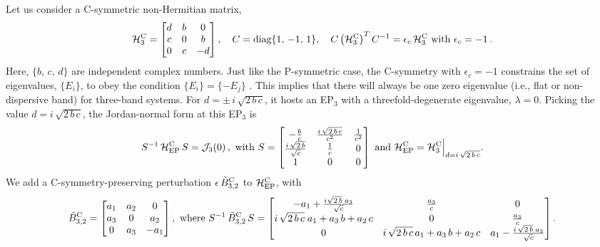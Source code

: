 \documentclass[aps, prb, onecolumn, nofootinbib, citeautoscript, 10pt]{revtex4-2}
\begin{document}
Let us consider a C-symmetric non-Hermitian matrix,
\begin{align}
\label{eqcsym}
\mathcal H^{\rm C}_3 = \begin{bmatrix}
 d & b & 0 \\
 c & 0 & b \\
 0 & c & -d \\
\end{bmatrix}, \quad
C =\text{diag}\lbrace 1,\,-1,\,1 \rbrace,\quad
C \left ( \mathcal H^{\rm C}_3\right )^T C^{-1} = \epsilon_c \, \mathcal H^{\rm C}_3  \text{ with } \epsilon_c=-1 \,.
\end{align}
Here, $\lbrace b, \, c,\, d \rbrace $ are independent complex numbers. Just like the P-symmetric case, the C-symmetry with $\epsilon_c = -1 $ constrains the set of eigenvalues, $ \lbrace E_i \rbrace$, to obey the condition $\lbrace E_i \rbrace = \lbrace - E_j \rbrace $ \cite{emil_nh_nodal}. This implies that there will always be one zero eigenvalue (i.e., flat or non-dispersive band) for three-band systems.
For $ d = \pm\,i\,\sqrt{2\, b\, c} $, it hosts an EP$_3$ with a threefold-degenerate eigenvalue, $\lambda = 0$. Picking the value $ d = i\,\sqrt{2\, b\, c} $, the Jordan-normal form at this EP$_3$ is
\begin{align}
S^{-1} \, {\mathcal H^{\rm C}_{\rm EP}}  \, S = \mathcal J_3(0)\,, \text{ with }
S = \begin{bmatrix}
-\frac{b}{c} & \frac{i \, \sqrt{2\, b\, c}}{c^2} & \frac{1}{c^2} \\
 \frac{i\, \sqrt{2 \,b}} {\sqrt c} & \frac{1}{c} & 0 \\
 1 & 0 & 0 \\
\end{bmatrix} \text{ and }
{\mathcal H^{\rm C}_{\rm EP}}  = {\mathcal H^{\rm C}_3} \Big \vert_{ d = i\,\sqrt{2\, b\, c}}.
\end{align}
We add a C-symmetry-preserving perturbation $\epsilon\, \tilde B^{\rm C}_{3,2}$ to ${\mathcal H^{\rm C}_{\rm EP}} $, with
\begin{align}
\tilde B^{\rm C}_{3,2} = \begin{bmatrix}
a_1 & a_2 & 0 \\
 a_3 & 0 & a_2 \\
 0 & a_3 & -a_1 \\
\end{bmatrix},  \text{ where }
S^{-1}\, \tilde B^{\rm C}_{3,2}\, S = 
\begin{bmatrix}
 -a_1+\frac{i \sqrt{2 \,b}\; a_3 } {\sqrt{c}} & \frac{a_3}{c} & 0 \\
 i \,\sqrt{2 \,b \,c}\; a_1 + a_3 \,b+a_2\, c & 0 & \frac{a_3}{c} \\
 0 & i\, \sqrt{2 \,b \,c}\, a_1 + a_3 \,b + a_2 \,c & a_1-\frac{i \,\sqrt{2\, b} \;a_3 } {\sqrt{c}} \\
 \end{bmatrix}.
\end{align}
\end{document}
